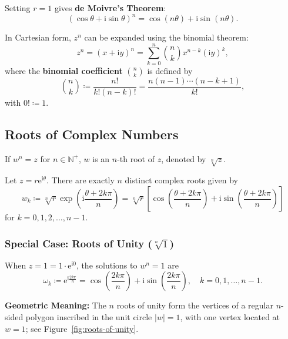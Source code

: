 \documentclass[11pt,a4paper]{article}
\theoremstyle{definition}
\theoremstyle{plain}
\begin{document}
Setting $r = 1$ gives \textbf{de Moivre's Theorem}:
\begin{equation}
(\cos\theta + \mathrm{i}\sin\theta)^n = \cos(n\theta) + \mathrm{i}\sin(n\theta).
\end{equation}

In Cartesian form, $z^n$ can be expanded using the binomial theorem:
\begin{equation}
z^n = (x + \mathrm{i} y)^n = \sum_{k=0}^n \binom{n}{k} x^{n-k} (\mathrm{i} y)^k,
\end{equation}
where the \textbf{binomial coefficient} $\binom{n}{k}$ is defined by
\begin{equation}
\binom{n}{k} \coloneqq \frac{n!}{k!(n-k)!} = \frac{n(n-1)\cdots(n-k+1)}{k!},
\end{equation}
with $0! \coloneqq 1$.

\subsection{Roots of Complex Numbers}



If $w^n = z$ for $n \in \mathbb{N}^+$, $w$ is an $n$-th root of $z$, denoted by $\sqrt[n]{z}$.

Let $z = r \mathrm{e}^{\mathrm{i}\theta}$. There are exactly $n$ distinct complex roots given by
\begin{equation}
w_k \coloneqq \sqrt[n]{r} \exp\left(\mathrm{i} \frac{\theta + 2k\pi}{n}\right) = \sqrt[n]{r}\left[\cos\left(\frac{\theta + 2k\pi}{n}\right) + \mathrm{i}\sin\left(\frac{\theta + 2k\pi}{n}\right)\right]
\end{equation}
for $k = 0, 1, 2, \dots, n-1$.

\subsubsection{Special Case: Roots of Unity ($\sqrt[n]{1}$)}



When $z = 1 = 1 \cdot \mathrm{e}^{\mathrm{i} 0}$, the solutions to $w^n = 1$ are
\begin{equation}
\omega_k \coloneqq \mathrm{e}^{\mathrm{i}\frac{2k\pi}{n}} = \cos\left(\frac{2k\pi}{n}\right) + \mathrm{i}\sin\left(\frac{2k\pi}{n}\right), \quad k = 0, 1, \dots, n-1.
\end{equation}

\textbf{Geometric Meaning:} The $n$ roots of unity form the vertices of a regular $n$-sided polygon inscribed in the unit circle $|w| = 1$, with one vertex located at $w = 1$; see Figure~\ref{fig:roots-of-unity}.
\end{document}
